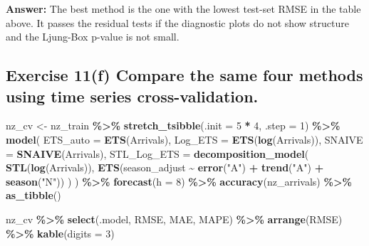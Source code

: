 \documentclass[
  11pt,
]{article}
\newenvironment{Shaded}{\begin{snugshade}}{\end{snugshade}}
\newcommand{\AttributeTok}[1]{\textcolor[rgb]{0.13,0.29,0.53}{#1}}
\newcommand{\DecValTok}[1]{\textcolor[rgb]{0.00,0.00,0.81}{#1}}
\newcommand{\FunctionTok}[1]{\textcolor[rgb]{0.13,0.29,0.53}{\textbf{#1}}}
\newcommand{\NormalTok}[1]{#1}
\newcommand{\OtherTok}[1]{\textcolor[rgb]{0.56,0.35,0.01}{#1}}
\newcommand{\SpecialCharTok}[1]{\textcolor[rgb]{0.81,0.36,0.00}{\textbf{#1}}}
\newcommand{\StringTok}[1]{\textcolor[rgb]{0.31,0.60,0.02}{#1}}
\begin{document}
\textbf{Answer:} The best method is the one with the lowest test-set
RMSE in the table above. It passes the residual tests if the diagnostic
plots do not show structure and the Ljung-Box p-value is not small.

\subsection{Exercise 11(f) Compare the same four methods using time
series
cross-validation.}\label{exercise-11f-compare-the-same-four-methods-using-time-series-cross-validation.}

\begin{Shaded}
\begin{Highlighting}[]
\NormalTok{nz\_cv }\OtherTok{\textless{}{-}}\NormalTok{ nz\_train }\SpecialCharTok{\%\textgreater{}\%}
  \FunctionTok{stretch\_tsibble}\NormalTok{(}\AttributeTok{.init =} \DecValTok{5} \SpecialCharTok{*} \DecValTok{4}\NormalTok{, }\AttributeTok{.step =} \DecValTok{1}\NormalTok{) }\SpecialCharTok{\%\textgreater{}\%}
  \FunctionTok{model}\NormalTok{(}
    \AttributeTok{ETS\_auto =} \FunctionTok{ETS}\NormalTok{(Arrivals),}
    \AttributeTok{Log\_ETS =} \FunctionTok{ETS}\NormalTok{(}\FunctionTok{log}\NormalTok{(Arrivals)),}
    \AttributeTok{SNAIVE =} \FunctionTok{SNAIVE}\NormalTok{(Arrivals),}
    \AttributeTok{STL\_Log\_ETS =} \FunctionTok{decomposition\_model}\NormalTok{(}
      \FunctionTok{STL}\NormalTok{(}\FunctionTok{log}\NormalTok{(Arrivals)),}
      \FunctionTok{ETS}\NormalTok{(season\_adjust }\SpecialCharTok{\textasciitilde{}} \FunctionTok{error}\NormalTok{(}\StringTok{"A"}\NormalTok{) }\SpecialCharTok{+} \FunctionTok{trend}\NormalTok{(}\StringTok{"A"}\NormalTok{) }\SpecialCharTok{+} \FunctionTok{season}\NormalTok{(}\StringTok{"N"}\NormalTok{))}
\NormalTok{    )}
\NormalTok{  ) }\SpecialCharTok{\%\textgreater{}\%}
  \FunctionTok{forecast}\NormalTok{(}\AttributeTok{h =} \DecValTok{8}\NormalTok{) }\SpecialCharTok{\%\textgreater{}\%}
  \FunctionTok{accuracy}\NormalTok{(nz\_arrivals) }\SpecialCharTok{\%\textgreater{}\%}
  \FunctionTok{as\_tibble}\NormalTok{()}

\NormalTok{nz\_cv }\SpecialCharTok{\%\textgreater{}\%}
  \FunctionTok{select}\NormalTok{(.model, RMSE, MAE, MAPE) }\SpecialCharTok{\%\textgreater{}\%}
  \FunctionTok{arrange}\NormalTok{(RMSE) }\SpecialCharTok{\%\textgreater{}\%}
  \FunctionTok{kable}\NormalTok{(}\AttributeTok{digits =} \DecValTok{3}\NormalTok{)}
\end{Highlighting}
\end{Shaded}
\end{document}
